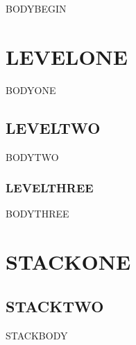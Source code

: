 \documentclass[fontsize=11pt]{scrartcl}
\begin{document}
\vspace*{30bp}
BODYBEGIN\par
\section{LEVELONE}
BODYONE\par
\subsection{LEVELTWO}
BODYTWO\par
\subsubsection{LEVELTHREE}
BODYTHREE\par
\section{STACKONE}
\subsection{STACKTWO}
STACKBODY
\end{document}
